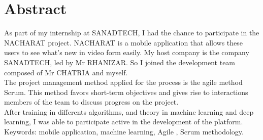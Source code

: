\documentclass[11pt, oneside]{Thesis} %
\begin{document}
\chapter*{Abstract}
As part of my internship at SANADTECH, I had the chance to participate in the NACHARAT project. NACHARAT is a mobile application that allows these users to see what’s new in video form easily. My host company is the company SANADTECH, led by Mr RHANIZAR. So I joined the development team composed of Mr CHATRIA and myself.\\
The project management method applied for the process is the agile method Scrum. This method favors short-term objectives and gives rise to interactions members of the team to discuss progress on the project.\\[0.2cm]
After training in differents algorithms, and theory in machine learning and deep learning, I was able to participate active in the development of the platform.\\[1cm]
Keywords: mobile application, machine learning, Agile , Scrum methodology.


%

\clearpage %




\pagestyle{fancy} %

\tableofcontents %

\listoffigures %


\clearpage %



\clearpage %

\end{document}
